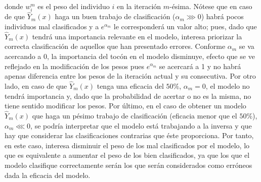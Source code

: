 \documentclass[12pt,twoside]{article}
\begin{document}
\noindent
donde $w_i^m$ es el peso del individuo $i$ en la iteración $m$-ésima. Nótese que en caso de que $\hat{Y}_m(x)$ haga un buen trabajo de clasificación ($\alpha_m \ggg 0$) habrá pocos individuos mal clasificados y a $e^{\alpha_m}$ le corresponderá un valor alto; pues, dado que $\hat{Y}_m(x)$ tendrá una importancia relevante en el modelo, interesa priorizar la correcta clasificación de aquellos que han presentado errores. Conforme $\alpha_m$ se va acercando a 0, la importancia del tocón en el modelo disminuye, efecto que se ve reflejado en la modificación de los pesos pues $e^{\alpha_m}$ se acercará a 1 y no habrá apenas diferencia entre los pesos de la iteración actual y su consecutiva. Por otro lado, en caso de que $\hat{Y}_m(x)$ tenga una eficacia del $50\%$, $\alpha_m = 0$, el modelo no tendrá importancia y, dado que la probabilidad de acertar o no es la misma, no tiene sentido modificar los pesos. Por último, en el caso de obtener un modelo $\hat{Y}_m(x)$ que haga un pésimo trabajo de clasificación (eficacia menor que el $50\%$), $\alpha_m \lll 0$, se podría interpretar que el modelo está trabajando a la inversa y que hay que considerar las clasificaciones contrarias que éste proporciona. Por tanto, en este caso, interesa disminuir el peso de los mal clasificados por el modelo, lo que es equivalente a aumentar el peso de los bien clasificados, ya que los que el modelo clasifique correctamente serán los que serán considerados como erróneos dada la eficacia del modelo.
\end{document}
